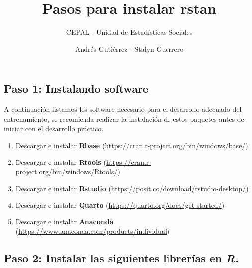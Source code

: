 \documentclass[
  letterpaper,
  DIV=11,
  numbers=noendperiod]{scrartcl}
\title{Pasos para instalar rstan}
\subtitle{CEPAL - Unidad de Estadísticas Sociales}
\author{Andrés Gutiérrez - Stalyn Guerrero}
\date{}
\providecommand{\tightlist}{%
  \setlength{\itemsep}{0pt}\setlength{\parskip}{0pt}}\usepackage{longtable,booktabs,array}
\begin{document}
\maketitle
\ifdefined\Shaded\renewenvironment{Shaded}{\begin{tcolorbox}[borderline west={3pt}{0pt}{shadecolor}, enhanced, interior hidden, sharp corners, breakable, frame hidden, boxrule=0pt]}{\end{tcolorbox}}\fi

\hypertarget{paso-1-instalando-software}{%
\subsection{Paso 1: Instalando
software}\label{paso-1-instalando-software}}

A continuación listamos los software necesario para el desarrollo
adecuado del entrenamiento, se recomienda realizar la instalación de
estos paquetes antes de iniciar con el desarrollo práctico.

\begin{enumerate}
\def\labelenumi{\arabic{enumi}.}
\tightlist
\item
  Descargar e instalar \textbf{Rbase}
  (\url{https://cran.r-project.org/bin/windows/base/})
\item
  Descargar e instalar \textbf{Rtools}
  (\url{https://cran.r-project.org/bin/windows/Rtools/})
\item
  Descargar e instalar \textbf{Rstudio}
  (\url{https://posit.co/download/rstudio-desktop/})
\item
  Descargar e instalar \textbf{Quarto}
  (\url{https://quarto.org/docs/get-started/})
\item
  Descargar e instalar \textbf{Anaconda}
  (\url{https://www.anaconda.com/products/individual})
\end{enumerate}

\hypertarget{paso-2-instalar-las-siguientes-libreruxedas-en-r.}{%
\subsection{\texorpdfstring{Paso 2: Instalar las siguientes librerías en
\emph{R.}}{Paso 2: Instalar las siguientes librerías en R.}}\label{paso-2-instalar-las-siguientes-libreruxedas-en-r.}}
\end{document}

